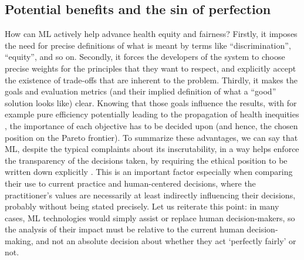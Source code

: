 \subsection{Potential benefits and the sin of perfection}
    How can ML actively help advance health equity and fairness?
    Firstly, it imposes the need for precise definitions of what is meant by terms like ``discrimination'', ``equity'', and so on.
    Secondly, it forces the developers of the system to choose precise weights for the principles that they want to respect, and explicitly accept the existence of trade-offs that are inherent to the problem.
    Thirdly, it makes the goals and evaluation metrics (and their implied definition of what a ``good'' solution looks like) clear.
    Knowing that those goals influence the results, with for example pure efficiency potentially leading to the propagation of health inequities \cite[p.~2]{Rajkomar2018}, the importance of each objective has to be decided upon (and hence, the chosen position on the Pareto frontier).
    To summarize these advantages, we can say that ML, despite the typical complaints about its inscrutability, in a way helps enforce the transparency of the decisions taken, by requiring the ethical position to be written down explicitly \cite{Williamson2021}.
    This is an important factor especially when comparing their use to current practice and human-centered decisions, where the practitioner's values are necessarily at least indirectly influencing their decisions, probably without being stated precisely.
    Let us reiterate this point: in many cases, ML technologies would simply assist or replace human decision-makers, so the analysis of their impact must be relative to the current human decision-making, and not an absolute decision about whether they act `perfectly fairly' or not.
    
